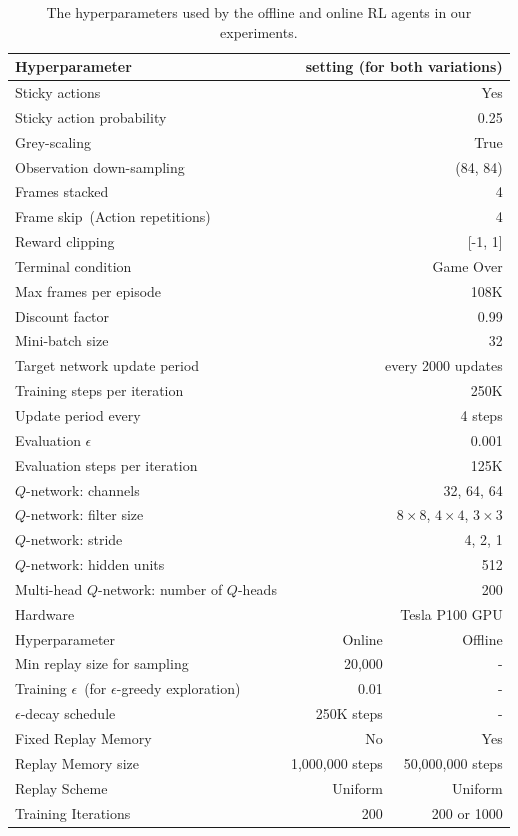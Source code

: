 \begin{table}[t]
\small
\caption{The hyperparameters used by the offline and online RL agents in our experiments.}
\centering
\begin{tabular}{lrr}
\toprule
Hyperparameter & \multicolumn{2}{r}{setting (for both variations)} \\
\midrule
Sticky actions && Yes        \\
Sticky action probability && 0.25\\
Grey-scaling && True \\
Observation down-sampling && (84, 84) \\
Frames stacked && 4 \\
Frame skip~(Action repetitions) && 4 \\
Reward clipping && [-1, 1] \\
Terminal condition && Game Over \\
Max frames per episode && 108K \\
Discount factor && 0.99 \\
Mini-batch size && 32 \\
Target network update period & \multicolumn{2}{r}{every 2000 updates} \\
Training steps per iteration && 250K \\
Update period every && 4 steps \\
Evaluation $\epsilon$ && 0.001 \\
Evaluation steps per iteration && 125K \\
$Q$-network: channels && 32, 64, 64 \\
$Q$-network: filter size && $8\times8$, $4\times4$, $3\times3$\\
$Q$-network: stride && 4, 2, 1\\
$Q$-network: hidden units && 512 \\
Multi-head $Q$-network: number of $Q$-heads && 200 \\
Hardware && Tesla P100 GPU \\
\midrule
Hyperparameter & Online & Offline\\
\midrule
Min replay size for sampling & 20,000 & - \\
Training $\epsilon$~(for $\epsilon$-greedy exploration) & 0.01 & - \\
$\epsilon$-decay schedule & 250K steps & - \\
Fixed Replay Memory & No & Yes \\
Replay Memory size & 1,000,000 steps & 50,000,000 steps \\
Replay Scheme & Uniform & Uniform \\
Training Iterations & 200 & 200 or 1000 \\
\bottomrule
\end{tabular}
\label{table:hyperparams}
\end{table}

